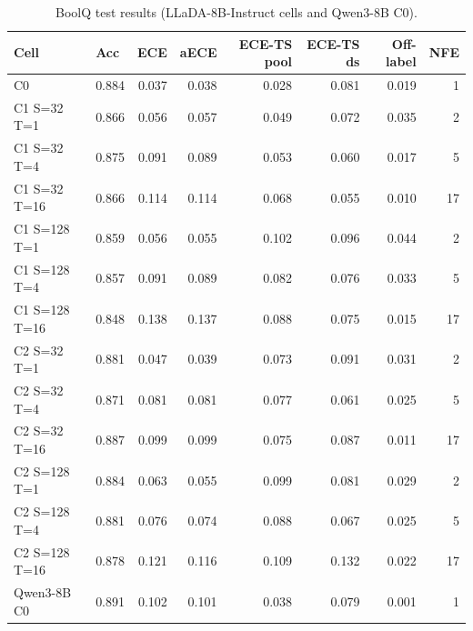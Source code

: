 \begin{table}[h!]
\centering
\small
\caption{BoolQ test results (LLaDA-8B-Instruct cells and Qwen3-8B C0).}
\label{tab:main_boolq}
\begin{tabular}{llrrrrrr}
\toprule
Cell & Acc & ECE & aECE & ECE-TS pool & ECE-TS ds & Off-label & NFE \\
\midrule
C0 & 0.884 & 0.037 & 0.038 & 0.028 & 0.081 & 0.019 & 1 \\
C1 S=32 T=1 & 0.866 & 0.056 & 0.057 & 0.049 & 0.072 & 0.035 & 2 \\
C1 S=32 T=4 & 0.875 & 0.091 & 0.089 & 0.053 & 0.060 & 0.017 & 5 \\
C1 S=32 T=16 & 0.866 & 0.114 & 0.114 & 0.068 & 0.055 & 0.010 & 17 \\
C1 S=128 T=1 & 0.859 & 0.056 & 0.055 & 0.102 & 0.096 & 0.044 & 2 \\
C1 S=128 T=4 & 0.857 & 0.091 & 0.089 & 0.082 & 0.076 & 0.033 & 5 \\
C1 S=128 T=16 & 0.848 & 0.138 & 0.137 & 0.088 & 0.075 & 0.015 & 17 \\
C2 S=32 T=1 & 0.881 & 0.047 & 0.039 & 0.073 & 0.091 & 0.031 & 2 \\
C2 S=32 T=4 & 0.871 & 0.081 & 0.081 & 0.077 & 0.061 & 0.025 & 5 \\
C2 S=32 T=16 & 0.887 & 0.099 & 0.099 & 0.075 & 0.087 & 0.011 & 17 \\
C2 S=128 T=1 & 0.884 & 0.063 & 0.055 & 0.099 & 0.081 & 0.029 & 2 \\
C2 S=128 T=4 & 0.881 & 0.076 & 0.074 & 0.088 & 0.067 & 0.025 & 5 \\
C2 S=128 T=16 & 0.878 & 0.121 & 0.116 & 0.109 & 0.132 & 0.022 & 17 \\
Qwen3-8B C0 & 0.891 & 0.102 & 0.101 & 0.038 & 0.079 & 0.001 & 1 \\
\bottomrule
\end{tabular}
\end{table}
